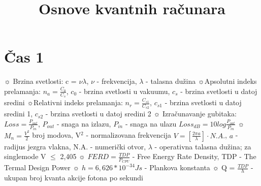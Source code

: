 \documentclass{article}
\title{Osnove kvantnih računara}
\author{}
\date{}
\begin{document}
\maketitle

\newpage
\section{Čas 1}

\begin{tcolorbox}[width=\textwidth,colback={beaublue},outer arc=0mm,colupper=charcoal]    $\sun$ Brzina svetlosti: c = $\nu$\cdot$\lambda$, $\nu$ - frekvencija, $\lambda$ - talasna dužina
\vspace{0.1cm}\newline
$\sun$Apsolutni indeks prelamanja: $n_a = \frac{C_0}{C_s}$, $c_0$ - brzina svetlosti u vakuumu, \newline \hspace*{0.4cm}$c_s$ - brzina svetlosti u datoj sredini
\vspace{0.1cm}\newline
$\sun$Relativni indeks prelamanja: $n_r = \frac{C_{s1}}{C_{s2}}$, $c_{s1}$ - brzina svetlosti u datoj sredini \hspace*{0.4cm}1, $c_{s2}$ - brzina svetlosti u datoj sredini 2
\vspace{0.1cm}\newline
$\sun$ Izračunavanje gubitaka: 
\vspace{0.1cm}\newline \hspace*{0.5cm} $Loss = \frac{P_{out}}{P_{in}}$, $P_{out}$ - snaga na izlazu, $P_{in}$ - snaga na ulazu
\vspace{0.1cm}\newline \hspace*{0.5cm} $Loss_{dB} = 10log\frac{P_{out}}{P_{in}}$
\vspace{0.1cm}\newline
$\sun$ $M_n = \frac{V^2}{2}$ broj modova, V$^2$ - normalizovana frekvencija
\vspace{0.1cm}\newline \hspace*{0.4cm}$V = [\frac{2\pi a}{\lambda}]\cdot N.A.$, $a$ - radijus jezgra vlakna, N.A. - numerički otvor, \vspace{0.1cm}\newline\hspace*{0.4cm}$\lambda$ - operativna talasna dužina; za singlemode V $\leq$ 2,405
\vspace{0.1cm}\newline
$\sun$ $FERD = \frac{TDP}{P_{CPU}}$ - Free Energy Rate Density, TDP - The Termal Design Power
\vspace{0.05cm}\newline
$\sun$ $h = 6,626*10^{-34}Js$ - Plankova konstanta
\vspace{0.05cm}\newline
$\sun$ Q = $\frac{TDP}{h}$ - ukupan broj kvanta akcije fotona po sekundi
\end{tcolorbox}  
\end{document}
